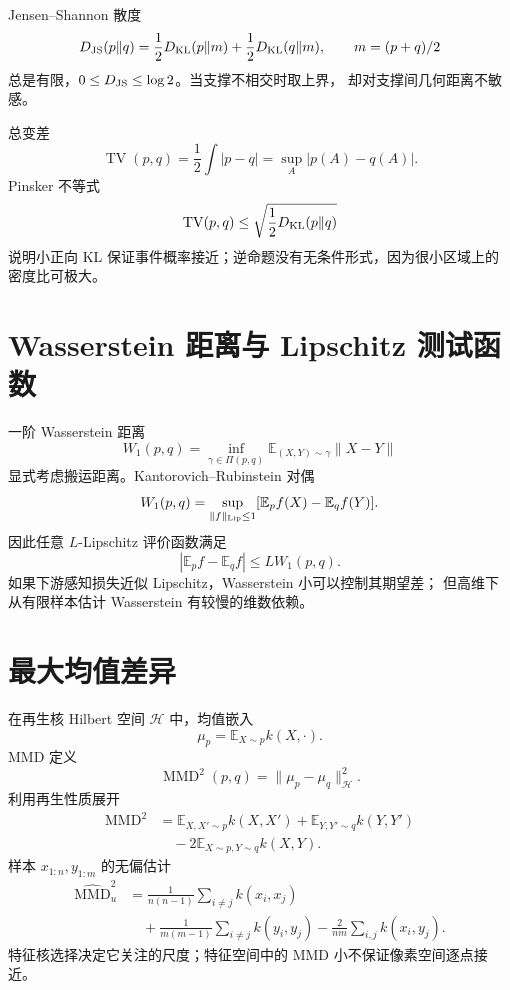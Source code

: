 \documentclass[11pt]{article}
\numberwithin{equation}{section}
\newcommand{\E}{\mathbb{E}}
\newcommand{\1}{\mathbf{1}}
\begin{document}
Jensen--Shannon 散度
\begin{equation}
 D_{\rm JS}(p\|q)=\frac12D_{\rm KL}(p\|m)
 +\frac12D_{\rm KL}(q\|m),\qquad m=(p+q)/2
\end{equation}
总是有限，$0\le D_{\rm JS}\le\log2$。当支撑不相交时取上界，
却对支撑间几何距离不敏感。

总变差
\begin{equation}
 \operatorname{TV}(p,q)=\frac12\int|p-q|
 =\sup_A|p(A)-q(A)|.
\end{equation}
Pinsker 不等式
\begin{equation}
 \operatorname{TV}(p,q)
 \le\sqrt{\frac12D_{\rm KL}(p\|q)}
\end{equation}
说明小正向 KL 保证事件概率接近；逆命题没有无条件形式，因为很小区域上的密度比可极大。

\section{Wasserstein 距离与 Lipschitz 测试函数}

一阶 Wasserstein 距离
\begin{equation}
 W_1(p,q)=\inf_{\gamma\in\Pi(p,q)}
 \E_{(X,Y)\sim\gamma}\|X-Y\|
\end{equation}
显式考虑搬运距离。Kantorovich--Rubinstein 对偶
\begin{equation}
 W_1(p,q)=\sup_{\|f\|_{\rm Lip}\le1}
 [\E_pf(X)-\E_qf(Y)].
\end{equation}
因此任意 $L$-Lipschitz 评价函数满足
\begin{equation}
 |\E_pf-\E_qf|\le L W_1(p,q).
\end{equation}
如果下游感知损失近似 Lipschitz，Wasserstein 小可以控制其期望差；
但高维下从有限样本估计 Wasserstein 有较慢的维数依赖。

\section{最大均值差异}

在再生核 Hilbert 空间 $\mathcal H$ 中，均值嵌入
\begin{equation}
 \mu_p=\E_{X\sim p}k(X,\cdot).
\end{equation}
MMD 定义
\begin{equation}
 \operatorname{MMD}^2(p,q)=\|\mu_p-\mu_q\|_{\mathcal H}^2.
\end{equation}
利用再生性质展开
\begin{align}
 \operatorname{MMD}^2
 &=\E_{X,X'\sim p}k(X,X')
 +\E_{Y,Y'\sim q}k(Y,Y')\\
 &\quad-2\E_{X\sim p,Y\sim q}k(X,Y).
\end{align}
样本 $x_{1:n},y_{1:m}$ 的无偏估计
\begin{align}
 \widehat{\operatorname{MMD}}_u^2
 &=\frac1{n(n-1)}\sum_{i\ne j}k(x_i,x_j)\\
 &\quad+\frac1{m(m-1)}\sum_{i\ne j}k(y_i,y_j)
 -\frac2{nm}\sum_{i,j}k(x_i,y_j).
\end{align}
特征核选择决定它关注的尺度；特征空间中的 MMD 小不保证像素空间逐点接近。
\end{document}

